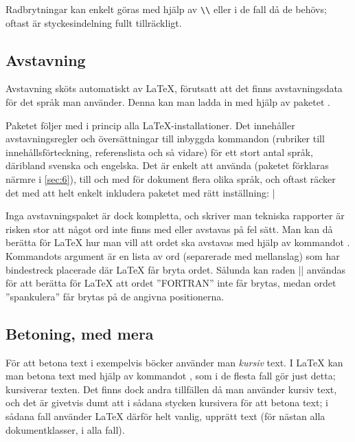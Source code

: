\documentclass[10pt,../../a4.tex]{subfiles}
\begin{document}
Radbrytningar kan enkelt göras med hjälp av \verb|\\| eller 
i de fall då de behövs; oftast är styckesindelning fullt tillräckligt.

\subsection{Avstavning}
Avstavning sköts automatiskt av \LaTeX{}, förutsatt att det finns
avstavningsdata för det språk man använder. Denna kan man ladda in med
hjälp av paketet .

Paketet  följer med i princip alla \LaTeX-installationer. 
Det innehåller avstavningsregler
och översättningar till inbyggda kommandon (rubriker till
innehållsförteckning, referenslista och så vidare) för ett stort antal
språk, däribland svenska och engelska. Det är enkelt att använda
 (paketet förklaras närmre i \cref{sec:6}), till och med
för dokument flera olika språk, och oftast räcker det med att helt
enkelt inkludera paketet med rätt inställning:
\latex|\usepackage[swedish]{babel} %

Inga avstavningspaket är dock kompletta, och skriver man tekniska 
rapporter är risken stor att något ord inte finns med eller avstavas på
fel sätt. Man kan då berätta för \LaTeX{} hur man vill att ordet ska
avstavas med hjälp av kommandot . Kommandots argument är
en lista av ord (separerade med mellanslag) som har bindestreck
placerade där \LaTeX{} får bryta ordet. Sålunda kan raden
\latex||
användas för att berätta för \LaTeX{} att ordet ”\textsc{FORTRAN}” inte 
får brytas, medan ordet ”spankulera” får brytas på de angivna 
positionerna.

\subsection{Betoning, med mera}
För att betona text i exempelvis böcker använder man \emph{kursiv} text. I
\LaTeX{} kan man betona text med hjälp av kommandot , som i de
flesta fall gör just detta; kursiverar texten. Det finns dock andra
tillfällen då man använder kursiv text, och det är givetvis dumt att i
sådana stycken kursivera för att betona text; i sådana fall använder
\LaTeX{} därför helt vanlig, upprätt text (för nästan alla 
dokumentklasser, i alla fall).
\end{document}
